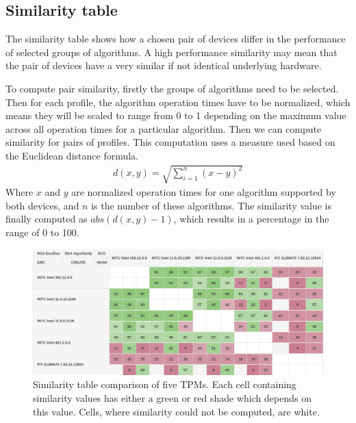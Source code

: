 \subsection{Similarity table}
The similarity table shows how a chosen pair of devices differ in the performance of selected groups of algorithms. A high performance similarity may mean that the pair of devices have a very similar if not identical underlying hardware.

To compute pair similarity, firstly the groups of algorithms need to be selected. Then for each profile, the algorithm operation times have to be normalized, which means they will be scaled to range from 0 to 1 depending on the maximum value across all operation times for a particular algorithm. Then we can compute similarity for pairs of profiles. This computation uses a measure used based on the Euclidean distance formula.
\begin{align*}
    d(x, y) = \sqrt{\sum_{i=1}^{n}(x - y)^{2}} 
\end{align*}
Where $x$ and $y$ are normalized operation times for one algorithm supported by both devices, and $n$ is the number of these algorithms. The similarity value is finally computed as $abs(d(x, y) - 1)$, which results in a percentage in the range of 0 to 100.
\begin{figure}[!tbp]
    \centering
    \includegraphics[width=\textwidth-0.54cm]{img/visualizations/tpm-similarity-intext.png}
    \caption{Similarity table comparison of five TPMs. Each cell containing similarity values has either a green or red shade which depends on this value. Cells, where similarity could not be computed, are white.}
    \label{fig:simtable-intext}
\end{figure}

